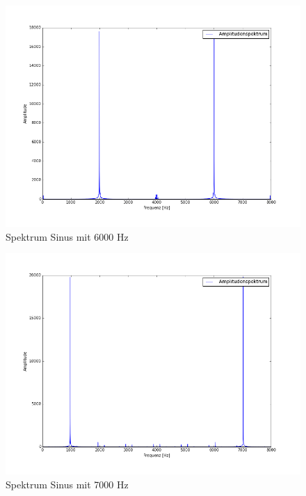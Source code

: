 \documentclass[12pt,oneside,a4paper]{report}
\begin{document}
\begin{figure}[H]
\centering\small
\includegraphics[scale=0.4]{src/6000fft.png}
\caption{Spektrum Sinus mit 6000 Hz}
\label{fig:6000_FFT}
\end{figure}

\begin{figure}[H]
\centering\small
\includegraphics[scale=0.4]{src/7000fft.png}
\caption{Spektrum Sinus mit 7000 Hz}
\label{fig:7000_FFT}
\end{figure}
\end{document}
